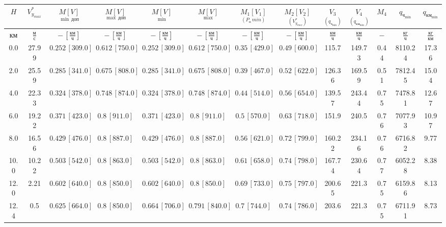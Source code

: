 \begin{tabular}{|c|c|c|c|c|c|c|c|c|c|c|c|c|}
\hline
$H$ & $V_{y_{max}}^*$ & $\underset{\min \, доп}{M [V]}$ & $\underset{\max \, доп}{M [V]}$ & $\underset{\min}{M [V]}$ & $\underset{\max}{M [V]}$ & $\underset{(P_п\, min)}{M_1 [V_1]}$ & $\underset{(V_{y_{max}}^*)}{M_2 [V_2]}$ & $\underset{(q_{ч_{\min}})}{V_3}$ & $\underset{(q_{{км}_{\min}})}{V_4}$ & $M_4$ & $q_{ч_{\min}}$ & $q_{{км}_{\min}}$ \\ 
\hline
$км$ & $\frac{м}{с}$ & $-\,[\frac{км}{ч}]$ & $-\,[\frac{км}{ч}]$ & $-\,[\frac{км}{ч}]$ & $-\,[\frac{км}{ч}]$ & $-\,[\frac{км}{ч}]$ & $-\,[\frac{км}{ч}]$ & $\frac{км}{ч}$ & $\frac{км}{ч}$ & $-$ & $\frac{кг}{ч}$ & $\frac{кг}{км}$ \\ 
\hline
0.0 & 27.99 & $0.252\, [309.0]$ & $0.612\, [750.0]$ & $0.252\, [309.0]$ & $0.612\, [750.0]$ & $0.35\, [429.0]$ & $0.49\, [600.0]$ & 115.7 & 149.73 & 0.44 & 8110.24 & 17.36 \\ 
\hline
2.0 & 25.59 & $0.285\, [341.0]$ & $0.675\, [808.0]$ & $0.285\, [341.0]$ & $0.675\, [808.0]$ & $0.39\, [467.0]$ & $0.52\, [622.0]$ & 126.36 & 169.59 & 0.51 & 7812.45 & 15.04 \\ 
\hline
4.0 & 22.33 & $0.324\, [378.0]$ & $0.748\, [874.0]$ & $0.324\, [378.0]$ & $0.748\, [874.0]$ & $0.44\, [514.0]$ & $0.56\, [654.0]$ & 139.57 & 243.44 & 0.75 & 7478.81 & 12.67 \\ 
\hline
6.0 & 19.22 & $0.371\, [423.0]$ & $0.8\, [911.0]$ & $0.371\, [423.0]$ & $0.8\, [911.0]$ & $0.5\, [570.0]$ & $0.63\, [718.0]$ & 151.9 & 240.5 & 0.76 & 7077.93 & 10.97 \\ 
\hline
8.0 & 16.56 & $0.429\, [476.0]$ & $0.8\, [887.0]$ & $0.429\, [476.0]$ & $0.8\, [887.0]$ & $0.56\, [621.0]$ & $0.72\, [799.0]$ & 160.22 & 234.16 & 0.76 & 6716.82 & 9.77 \\ 
\hline
10.0 & 10.22 & $0.503\, [542.0]$ & $0.8\, [863.0]$ & $0.503\, [542.0]$ & $0.8\, [863.0]$ & $0.61\, [658.0]$ & $0.74\, [798.0]$ & 167.74 & 230.64 & 0.77 & 6052.28 & 8.38 \\ 
\hline
12.0 & 2.21 & $0.602\, [640.0]$ & $0.8\, [850.0]$ & $0.602\, [640.0]$ & $0.8\, [850.0]$ & $0.69\, [733.0]$ & $0.75\, [797.0]$ & 200.65 & 221.3 & 0.75 & 6159.86 & 8.13 \\ 
\hline
12.4 & 0.5 & $0.625\, [664.0]$ & $0.8\, [850.0]$ & $0.664\, [706.0]$ & $0.791\, [840.0]$ & $0.7\, [744.0]$ & $0.74\, [786.0]$ & 203.6 & 221.3 & 0.75 & 6711.91 & 8.73 \\ 
\hline
\end{tabular}